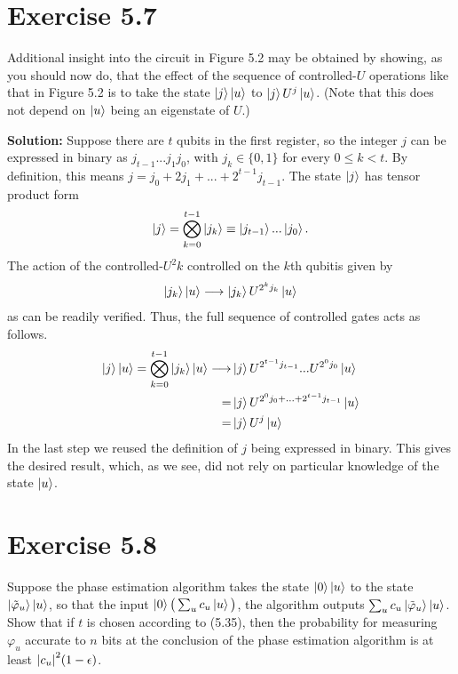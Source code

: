 \documentclass{book}
\begin{document}
\section*{Exercise 5.7}
    Additional insight into the circuit in Figure 5.2 may be obtained by showing, as you should now do, that the effect of the sequence of controlled-$U$ operations like that in Figure 5.2 is to take the state $\ket{j}\ket{u}$ to $\ket{j}U^j\ket{u}$. (Note that this does not depend on $\ket{u}$ being an eigenstate of $U$.)

    \textbf{Solution:} Suppose there are $t$ qubits in the first register, so the integer $j$ can be expressed in binary as $j_{t-1}...j_1j_0$, with $j_k \in \{0,1\}$ for every $0\leq k < t$. By definition, this means $j = j_0 + 2j_1 + ... + 2^{t-1}j_{t-1}$. The state $\ket{j}$ has tensor product form
    \begin{align}
        \ket{j} = \bigotimes_{k=0}^{t-1} \ket{j_k} \equiv \ket{j_{t-1}}...\ket{j_{0}}.
    \end{align}
    The action of the controlled-$U^2k$ controlled on the $k$th qubitis given by
    \begin{align}
        \ket{j_k}\ket{u} \longrightarrow  \ket{j_k} U^{2^k j_k}\ket{u}
    \end{align}
    as can be readily verified. Thus, the full sequence of controlled gates acts as follows.
    \begin{align}
    \begin{aligned}
        \ket{j}\ket{u} = \bigotimes_{k=0}^{t-1} \ket{j_k}\ket{u} \longrightarrow &\ket{j}U^{2^{t-1}j_{t-1}}...U^{2^0 j_0}\ket{u} \\
        = &\ket{j}U^{2^0 j_0 + ... + 2^{t-1} j_{t-1}}\ket{u} \\
        = &\ket{j}U^j\ket{u}
    \end{aligned}
    \end{align}
    In the last step we reused the definition of $j$ being expressed in binary. This gives the desired result, which, as we see, did not rely on particular knowledge of the state $\ket{u}$.

\section*{Exercise 5.8}
    Suppose the phase estimation algorithm takes the state $\ket{0}\ket{u}$ to the state $\ket{\tilde{\varphi}_u}\ket{u}$, so that the input $\ket{0}\big(\sum_u c_u\ket{u}\big)$, the algorithm outputs $\sum_u c_u\ket{\tilde{\varphi}_u}\ket{u}$. Show that if $t$ is chosen according to (5.35), then the probability for measuring $\varphi_u$ accurate to $n$ bits at the conclusion of the phase estimation algorithm is at least $\abs{c_u}^2(1-\epsilon)$.
\end{document}
